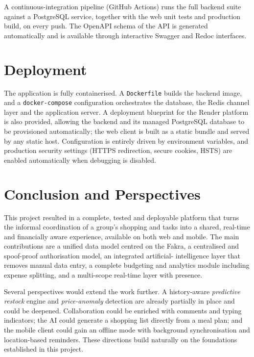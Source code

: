 \documentclass[12pt,a4paper,oneside]{report}
\begin{document}
A continuous-integration pipeline (GitHub Actions) runs the full backend suite
against a PostgreSQL service, together with the web unit tests and production
build, on every push. The OpenAPI schema of the API is generated automatically
and is available through interactive Swagger and Redoc interfaces.

\chapter{Deployment}\label{ch:deploy}
The application is fully containerised. A \texttt{Dockerfile} builds the backend
image, and a \texttt{docker-compose} configuration orchestrates the database,
the Redis channel layer and the application server. A deployment blueprint for
the Render platform is also provided, allowing the backend and its managed
PostgreSQL database to be provisioned automatically; the web client is built as
a static bundle and served by any static host. Configuration is entirely driven
by environment variables, and production security settings (HTTPS redirection,
secure cookies, HSTS) are enabled automatically when debugging is disabled.

\chapter*{Conclusion and Perspectives}
This project resulted in a complete, tested and deployable platform that turns
the informal coordination of a group's shopping and tasks into a shared,
real-time and financially aware experience, available on both web and mobile.
The main contributions are a unified data model centred on the Fakra, a
centralised and spoof-proof authorisation model, an integrated artificial-
intelligence layer that removes manual data entry, a complete budgeting and
analytics module including expense splitting, and a multi-scope real-time layer
with presence.

Several perspectives would extend the work further. A history-aware
\emph{predictive restock} engine and \emph{price-anomaly} detection are already
partially in place and could be deepened. Collaboration could be enriched with
comments and typing indicators; the AI could generate a shopping list directly
from a meal plan; and the mobile client could gain an offline mode with
background synchronisation and location-based reminders. These directions build
naturally on the foundations established in this project.
\end{document}

